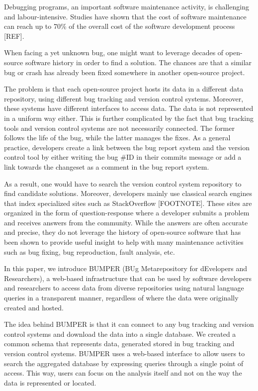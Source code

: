 \documentclass[conference]{IEEEtran}
\begin{document}
Debugging programs, an important software maintenance activity, is challenging \cite{Pressman2005} and labour-intensive. Studies have shown that the cost of software maintenance can reach up to 70\% of the overall cost of the software development process [REF].

When facing a yet unknown bug, one might want to leverage decades of open-source software history in order to find a solution. The chances are that a similar bug or crash has already been fixed somewhere in another open-source project.

The problem is that each open-source project hosts its data in a different data repository, using different bug tracking and version control systems. Moreover, these systems have different interfaces to access data.
The data is not represented in a uniform way either.
This is further complicated by the fact that bug tracking tools and version control systems are not necessarily connected.
The former follows the life of the bug, while the latter manages the fixes.
As a general practice, developers create a link between the bug report system and the version control tool by either writing the bug \#ID in their commits message or add a link towards the changeset as a comment in the bug report system.

As a result, one would have to search the version control system repository to find candidate solutions.
 Moreover, developers mainly use classical search engines that index specialized sites such as StackOverflow [FOOTNOTE]. These sites are organized in the form of question-response where a developer submits a problem and receives answers from the community. While the answers are often accurate and precise, they do not leverage the history of open-source software that has been shown to provide useful insight to help with many maintenance activities such as bug fixing\cite{Saha2014}, bug reproduction\cite{Chen2013a}, fault analysis\cite{Nessa2008}, etc.

In this paper, we introduce BUMPER (BUg Metarepository for dEvelopers and Researchers), a web-based infrastructure that can be used by software developers and researchers to access data from diverse repositories using natural language queries in a transparent manner, regardless of where the data were originally created and hosted.

The idea behind BUMPER is that it can connect to any bug tracking and version control systems and download the data into a single database. We created a common schema that represents data, generated stored in bug tracking and version control systems.
BUMPER uses a web-based interface to allow users to search the aggregated database by expressing queries through a single point of access.
This way, users can focus on the analysis itself and not on the way the data is represented or located.
\end{document}

